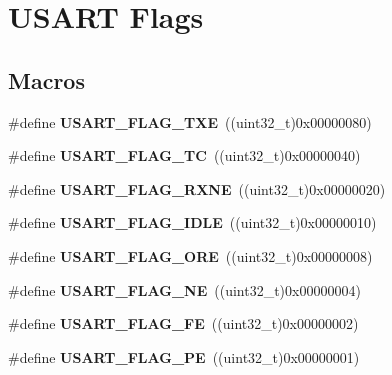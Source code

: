 \hypertarget{group___u_s_a_r_t___flags}{}\section{U\+S\+A\+RT Flags}
\label{group___u_s_a_r_t___flags}
\subsection*{Macros}
\begin{DoxyCompactItemize}
\item 
\#define {\bfseries U\+S\+A\+R\+T\+\_\+\+F\+L\+A\+G\+\_\+\+T\+XE}~((uint32\+\_\+t)0x00000080)\hypertarget{group___u_s_a_r_t___flags_ga7129f13333f2a7218838cc32fe507bfa}{}\label{group___u_s_a_r_t___flags_ga7129f13333f2a7218838cc32fe507bfa}

\item 
\#define {\bfseries U\+S\+A\+R\+T\+\_\+\+F\+L\+A\+G\+\_\+\+TC}~((uint32\+\_\+t)0x00000040)\hypertarget{group___u_s_a_r_t___flags_gae7b85c9e2cc86af5bbc8b8d8b854410f}{}\label{group___u_s_a_r_t___flags_gae7b85c9e2cc86af5bbc8b8d8b854410f}

\item 
\#define {\bfseries U\+S\+A\+R\+T\+\_\+\+F\+L\+A\+G\+\_\+\+R\+X\+NE}~((uint32\+\_\+t)0x00000020)\hypertarget{group___u_s_a_r_t___flags_ga11d6b70c8f00216b6d8a43790dfdcf2f}{}\label{group___u_s_a_r_t___flags_ga11d6b70c8f00216b6d8a43790dfdcf2f}

\item 
\#define {\bfseries U\+S\+A\+R\+T\+\_\+\+F\+L\+A\+G\+\_\+\+I\+D\+LE}~((uint32\+\_\+t)0x00000010)\hypertarget{group___u_s_a_r_t___flags_gac2f1ccc91a834f9cbec3f058872b972a}{}\label{group___u_s_a_r_t___flags_gac2f1ccc91a834f9cbec3f058872b972a}

\item 
\#define {\bfseries U\+S\+A\+R\+T\+\_\+\+F\+L\+A\+G\+\_\+\+O\+RE}~((uint32\+\_\+t)0x00000008)\hypertarget{group___u_s_a_r_t___flags_gabdb285b5c1876d93f9c802f9304538d5}{}\label{group___u_s_a_r_t___flags_gabdb285b5c1876d93f9c802f9304538d5}

\item 
\#define {\bfseries U\+S\+A\+R\+T\+\_\+\+F\+L\+A\+G\+\_\+\+NE}~((uint32\+\_\+t)0x00000004)\hypertarget{group___u_s_a_r_t___flags_ga81781d27ffc8b85dfaf7b7b791229547}{}\label{group___u_s_a_r_t___flags_ga81781d27ffc8b85dfaf7b7b791229547}

\item 
\#define {\bfseries U\+S\+A\+R\+T\+\_\+\+F\+L\+A\+G\+\_\+\+FE}~((uint32\+\_\+t)0x00000002)\hypertarget{group___u_s_a_r_t___flags_ga3551a32bac49a2ec040e5fdafcc9c4bd}{}\label{group___u_s_a_r_t___flags_ga3551a32bac49a2ec040e5fdafcc9c4bd}

\item 
\#define {\bfseries U\+S\+A\+R\+T\+\_\+\+F\+L\+A\+G\+\_\+\+PE}~((uint32\+\_\+t)0x00000001)\hypertarget{group___u_s_a_r_t___flags_ga5e87fde5704f27c75df25395e23404ad}{}\label{group___u_s_a_r_t___flags_ga5e87fde5704f27c75df25395e23404ad}

\end{DoxyCompactItemize}


